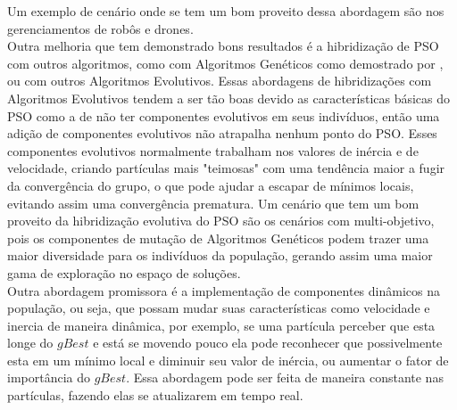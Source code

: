 %
\indent Um exemplo de cenário onde se tem um bom proveito dessa abordagem são nos gerenciamentos de robôs e drones.\\  
\indent Outra melhoria que tem demonstrado bons resultados é a hibridização de PSO com outros algoritmos, como com Algoritmos Genéticos como demostrado por \cite{carvalho2014}, ou com outros Algoritmos Evolutivos.
%
Essas abordagens de hibridizações com Algoritmos Evolutivos tendem a ser tão boas devido as características básicas do PSO como a de não ter componentes evolutivos em seus indivíduos, então uma adição de componentes evolutivos não atrapalha nenhum ponto do PSO.
%
Esses componentes evolutivos normalmente trabalham nos valores de inércia e de velocidade, criando partículas mais "teimosas" com uma tendência maior a fugir da convergência do grupo, o que pode ajudar a escapar de mínimos locais, evitando assim uma convergência prematura.
%
Um cenário que tem um bom proveito da hibridização evolutiva do PSO são os cenários com multi-objetivo, pois os componentes de mutação de Algoritmos Genéticos podem trazer uma maior diversidade para os indivíduos da população, gerando assim uma maior gama de exploração no espaço de soluções.\\
\indent Outra abordagem promissora é a implementação de componentes dinâmicos na população, ou seja, que possam mudar suas características como velocidade e inercia de maneira dinâmica, por exemplo, se uma partícula perceber que esta longe do $gBest$ e está se movendo pouco ela pode reconhecer que possivelmente esta em um mínimo local e diminuir seu valor de inércia, ou aumentar o fator de importância do $gBest$.
%
Essa abordagem pode ser feita de maneira constante nas partículas, fazendo elas se atualizarem em tempo real.
%

%
